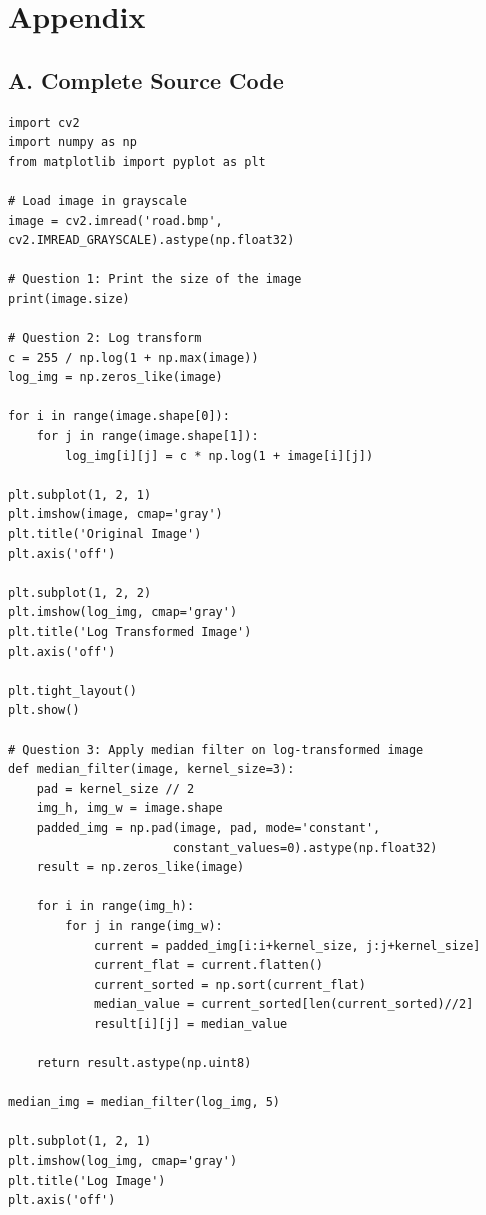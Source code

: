 \documentclass[12pt,a4paper]{article}
\begin{document}
\newpage
\section*{Appendix}

\subsection*{A. Complete Source Code}
{}

\begin{lstlisting}[caption={Complete Python Implementation}]
import cv2
import numpy as np
from matplotlib import pyplot as plt

# Load image in grayscale
image = cv2.imread('road.bmp', cv2.IMREAD_GRAYSCALE).astype(np.float32)

# Question 1: Print the size of the image
print(image.size)

# Question 2: Log transform
c = 255 / np.log(1 + np.max(image))
log_img = np.zeros_like(image)

for i in range(image.shape[0]):
    for j in range(image.shape[1]):
        log_img[i][j] = c * np.log(1 + image[i][j])

plt.subplot(1, 2, 1)
plt.imshow(image, cmap='gray')
plt.title('Original Image')
plt.axis('off')

plt.subplot(1, 2, 2)
plt.imshow(log_img, cmap='gray')
plt.title('Log Transformed Image')
plt.axis('off')

plt.tight_layout()
plt.show()

# Question 3: Apply median filter on log-transformed image
def median_filter(image, kernel_size=3):
    pad = kernel_size // 2
    img_h, img_w = image.shape
    padded_img = np.pad(image, pad, mode='constant', 
                       constant_values=0).astype(np.float32)
    result = np.zeros_like(image)
    
    for i in range(img_h):
        for j in range(img_w):
            current = padded_img[i:i+kernel_size, j:j+kernel_size]
            current_flat = current.flatten()
            current_sorted = np.sort(current_flat)
            median_value = current_sorted[len(current_sorted)//2]
            result[i][j] = median_value
    
    return result.astype(np.uint8)

median_img = median_filter(log_img, 5)

plt.subplot(1, 2, 1)
plt.imshow(log_img, cmap='gray')
plt.title('Log Image')
plt.axis('off')


\end{lstlisting}
\end{document}
